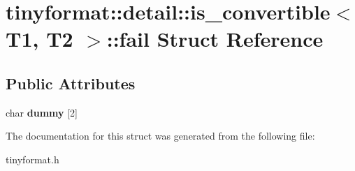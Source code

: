 \hypertarget{structtinyformat_1_1detail_1_1is__convertible_1_1fail}{}\section{tinyformat\+:\+:detail\+:\+:is\+\_\+convertible$<$ T1, T2 $>$\+:\+:fail Struct Reference}
\label{structtinyformat_1_1detail_1_1is__convertible_1_1fail}
\subsection*{Public Attributes}
\begin{DoxyCompactItemize}
\item 
\mbox{\label{structtinyformat_1_1detail_1_1is__convertible_1_1fail_a5d18f7fcac212bbe55692586aee8954d}} 
char {\bfseries dummy} \mbox{[}2\mbox{]}
\end{DoxyCompactItemize}


The documentation for this struct was generated from the following file\+:\begin{DoxyCompactItemize}
\item 
tinyformat.\+h\end{DoxyCompactItemize}
